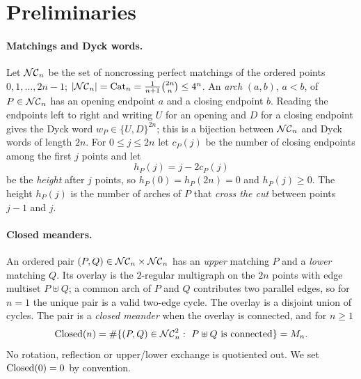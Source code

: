 \section{Preliminaries}
\label{sec:prelim}

\paragraph{Matchings and Dyck words.}
Let $\mathcal{NC}_n$ be the set of noncrossing perfect matchings of the ordered points
$0,1,\dots,2n-1$; $|\mathcal{NC}_n|=\mathrm{Cat}_n=\frac{1}{n+1}\binom{2n}{n}\le4^{n}$.
An \emph{arch} $(a,b)$, $a<b$, of $P\in\mathcal{NC}_n$ has an opening endpoint $a$ and a
closing endpoint $b$. Reading the endpoints left to right and writing $U$ for an
opening and $D$ for a closing endpoint gives the Dyck word $w_P\in\{U,D\}^{2n}$;
this is a bijection between $\mathcal{NC}_n$ and Dyck words of length $2n$. For
$0\le j\le2n$ let $c_P(j)$ be the number of closing endpoints among the first
$j$ points and let
\[
 h_P(j)=j-2c_P(j)
\]
be the \emph{height} after $j$ points, so $h_P(0)=h_P(2n)=0$ and
$h_P(j)\ge0$. The height $h_P(j)$ is the number of arches of $P$ that
\emph{cross the cut} between points $j-1$ and $j$.

\paragraph{Closed meanders.}
An ordered pair $(P,Q)\in\mathcal{NC}_n\times\mathcal{NC}_n$ has an \emph{upper} matching $P$ and a
\emph{lower} matching $Q$. Its overlay is the $2$-regular multigraph on the $2n$
points with edge multiset $P\uplus Q$; a common arch of $P$ and $Q$ contributes
two parallel edges, so for $n=1$ the unique pair is a valid two-edge cycle. The
overlay is a disjoint union of cycles. The pair is a \emph{closed meander} when
the overlay is connected, and for $n\ge1$
\[
 \operatorname{Closed}(n)=\#\{(P,Q)\in\mathcal{NC}_n^2:\ P\uplus Q\text{ is connected}\}=M_n .
\]
No rotation, reflection or upper/lower exchange is quotiented out. We set
$\operatorname{Closed}(0)=0$ by convention.

